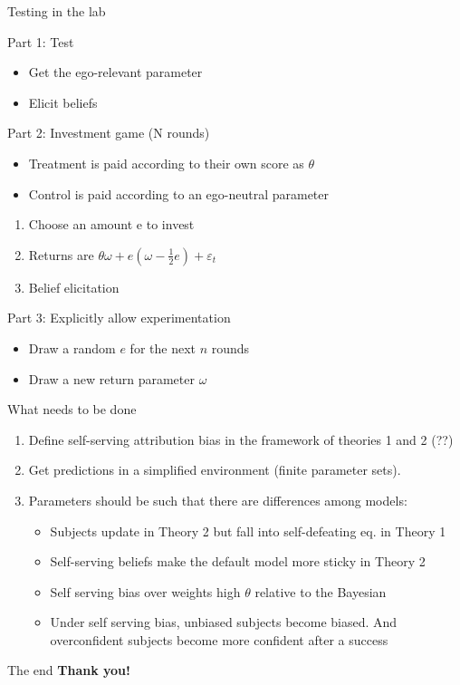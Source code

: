 \documentclass[aspectratio=169]{beamer}
\begin{document}
\begin{frame}{Testing in the lab}

Part 1: Test\\
\begin{itemize}
    \item Get the ego-relevant parameter
    \item Elicit beliefs
\end{itemize}
\pause
Part 2: Investment game (N rounds)\\
\begin{itemize}
    \item Treatment is paid according to their own score as $\theta$ 
    \item Control is paid according to an ego-neutral parameter 
\end{itemize}
\begin{enumerate}
    \item Choose an amount e to invest
    \item Returns are $\theta \omega + e(\omega-\frac{1}{2}e) + \varepsilon_t$
    \item Belief elicitation
\end{enumerate}
\pause
Part 3: Explicitly allow experimentation
\begin{itemize}
    \item Draw a random $e$ for the next $n$ rounds
    \item Draw a new return parameter $\omega$
\end{itemize}

\end{frame}

\begin{frame}{What needs to be done}
    \begin{enumerate}
        \item Define self-serving attribution bias in the framework of theories 1 and 2 (??)\\
        \bigskip
        \item Get predictions in a simplified environment (finite parameter sets).
        \bigskip
        \item Parameters should be such that there are differences among models:
        \begin{itemize}
            \item Subjects update in Theory 2 but fall into self-defeating eq. in Theory 1
            \item Self-serving beliefs make the default model more sticky in Theory 2 
            \item Self serving bias over weights high $\theta$ relative to the Bayesian
            \item Under self serving bias, unbiased subjects become biased. And overconfident subjects become more confident after a success
        \end{itemize}
    \end{enumerate}
\end{frame}

\begin{frame}{The end}
    \large\textbf{Thank you!}
\end{frame}
\end{document}
